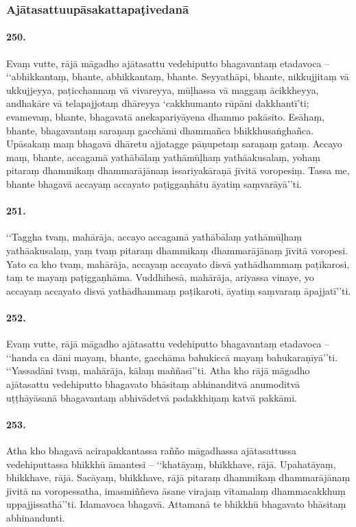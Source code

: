\subsubsection{Ajātasattuupāsakattapaṭivedanā}

\paragraph{250.} Evaṃ vutte, rājā māgadho ajātasattu vedehiputto bhagavantaṃ etadavoca – ‘‘abhikkantaṃ, bhante, abhikkantaṃ, bhante. Seyyathāpi, bhante, nikkujjitaṃ vā ukkujjeyya, paṭicchannaṃ vā vivareyya, mūḷhassa vā maggaṃ ācikkheyya, andhakāre vā telapajjotaṃ dhāreyya ‘cakkhumanto rūpāni dakkhantī’ti; evamevaṃ, bhante, bhagavatā anekapariyāyena dhammo pakāsito. Esāhaṃ, bhante, bhagavantaṃ saraṇaṃ gacchāmi dhammañca bhikkhusaṅghañca. Upāsakaṃ maṃ bhagavā dhāretu ajjatagge pāṇupetaṃ saraṇaṃ gataṃ. Accayo maṃ, bhante, accagamā yathābālaṃ yathāmūḷhaṃ yathāakusalaṃ, yohaṃ pitaraṃ dhammikaṃ dhammarājānaṃ issariyakāraṇā jīvitā voropesiṃ. Tassa me, bhante bhagavā accayaṃ accayato paṭiggaṇhātu āyatiṃ saṃvarāyā’’ti.

\paragraph{251.} ‘‘Taggha tvaṃ, mahārāja, accayo accagamā yathābālaṃ yathāmūḷhaṃ yathāakusalaṃ, yaṃ tvaṃ pitaraṃ dhammikaṃ dhammarājānaṃ jīvitā voropesi. Yato ca kho tvaṃ, mahārāja, accayaṃ accayato disvā yathādhammaṃ paṭikarosi, taṃ te mayaṃ paṭiggaṇhāma. Vuddhihesā, mahārāja, ariyassa vinaye, yo accayaṃ accayato disvā yathādhammaṃ paṭikaroti, āyatiṃ saṃvaraṃ āpajjatī’’ti.

\paragraph{252.} Evaṃ vutte, rājā māgadho ajātasattu vedehiputto bhagavantaṃ etadavoca – ‘‘handa ca dāni mayaṃ, bhante, gacchāma bahukiccā mayaṃ bahukaraṇīyā’’ti. ‘‘Yassadāni tvaṃ, mahārāja, kālaṃ maññasī’’ti. Atha kho rājā māgadho ajātasattu vedehiputto bhagavato bhāsitaṃ abhinanditvā anumoditvā uṭṭhāyāsanā bhagavantaṃ abhivādetvā padakkhiṇaṃ katvā pakkāmi.

\paragraph{253.} Atha kho bhagavā acirapakkantassa rañño māgadhassa ajātasattussa vedehiputtassa bhikkhū āmantesi – ‘‘khatāyaṃ, bhikkhave, rājā. Upahatāyaṃ, bhikkhave, rājā. Sacāyaṃ, bhikkhave, rājā pitaraṃ dhammikaṃ dhammarājānaṃ jīvitā na voropessatha, imasmiññeva āsane virajaṃ vītamalaṃ dhammacakkhuṃ uppajjissathā’’ti. Idamavoca bhagavā. Attamanā te bhikkhū bhagavato bhāsitaṃ abhinandunti.

